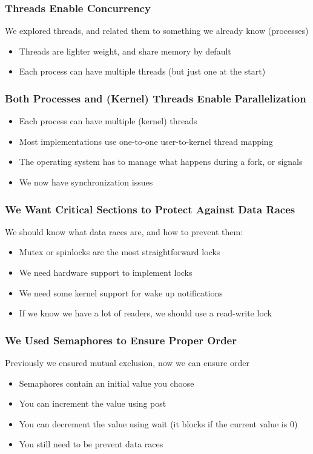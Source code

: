   \begin{frame}
    \frametitle{Threads Enable Concurrency}

    We explored threads, and related them to something we already know (processes)
    \begin{itemize}
      \item Threads are lighter weight, and share memory by default
      \item Each process can have multiple threads (but just one at the start)
    \end{itemize}
  \end{frame}

  \begin{frame}
    \frametitle{Both Processes and (Kernel) Threads Enable Parallelization}

    \begin{itemize}
      \item Each process can have multiple (kernel) threads
      \item Most implementations use one-to-one user-to-kernel thread mapping
      \item The operating system has to manage what happens during a fork, or signals
      \item We now have synchronization issues
    \end{itemize}
  \end{frame}

  \begin{frame}
    \frametitle{We Want Critical Sections to Protect Against Data Races}

    We should know what data races are, and how to prevent them:
    \begin{itemize}
      \item Mutex or spinlocks are the most straightforward locks
      \item We need hardware support to implement locks
      \item We need some kernel support for wake up notifications
      \item If we know we have a lot of readers, we should use a read-write lock
    \end{itemize}
  \end{frame}
  
  \begin{frame}
    \frametitle{We Used Semaphores to Ensure Proper Order}

    Previously we ensured mutual exclusion, now we can ensure order

    \begin{itemize}
      \item Semaphores contain an initial value you choose
      \item You can increment the value using post
      \item You can decrement the value using wait (it blocks if the current
            value is 0)
      \item You still need to be prevent data races
    \end{itemize}
  \end{frame}

